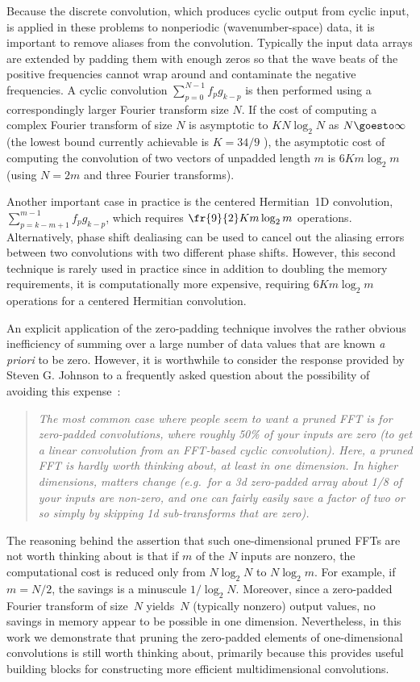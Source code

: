 \documentclass[final]{siamltex}
\begin{document}
Because the discrete convolution, which produces cyclic output from cyclic
input, is applied in these problems to nonperiodic (wavenumber-space) data,
it is important
to remove aliases from the convolution. Typically the input data arrays are
extended by padding them with enough zeros so that the wave beats of
the positive frequencies cannot wrap around and contaminate
the negative frequencies. A cyclic convolution $\sum_{p=0}^{N-1} f_p g_{k-p}$ 
is then performed using a
correspondingly larger Fourier transform size $N$. If the cost of 
computing a complex Fourier transform of size $N$ is asymptotic to 
$K N\log_2 N$ as \hbox{$N\goesto\infty$} (the lowest bound currently 
achievable is $K=34/9$ \cite{Johnson07,Lundy07}), the asymptotic cost of
computing the convolution of two vectors of unpadded length $m$ is
$6Km\log_2 m$ (using $N=2m$ and three Fourier transforms).

Another important case in practice is the centered Hermitian~1D convolution,
$\sum_{p=k-m+1}^{m-1} f_p g_{k-p}$, which requires $\fr{9}{2}Km\log_2 m$
operations.
Alternatively, phase shift dealiasing \cite{Patterson71,Canuto06} can be used
to cancel out the aliasing errors between two convolutions with two
different phase shifts. However, this second technique is rarely used in
practice since in addition to doubling the memory requirements, it is
computationally more expensive, requiring $6K m\log_2 m$ operations for a 
centered Hermitian convolution.

An explicit application of the zero-padding technique involves the rather
obvious inefficiency of summing over a large number of data values that
are known {\it a priori\/} to be zero.
However, it is worthwhile to consider the response
provided by Steven G. Johnson to a frequently asked question about the
possibility of avoiding this expense~\cite{fftwprune}:
\begin{quotation}\label{Johnson}
{\it
The most common case where people seem to want a pruned FFT is for
zero-padded convolutions, where roughly 50\% of your inputs are zero (to
get a linear convolution from an FFT-based cyclic convolution). Here, a
pruned FFT is hardly worth thinking about, at least in one dimension. In
higher dimensions, matters change (e.g.\ for a 3d zero-padded array about
1/8 of your inputs are non-zero, and one can fairly easily save a factor of
two or so simply by skipping 1d sub-transforms that are zero).
}
\end{quotation}

The reasoning behind the assertion that such one-dimensional pruned FFTs
are not worth thinking about is that if $m$ of the $N$ inputs are nonzero,
the computational cost is reduced only from $N\log_2 N$ to $N\log_2 m$.
For example, if $m=N/2$, the savings is a minuscule $1/\log_2 N$.
Moreover, since a zero-padded Fourier transform of size~$N$ yields~$N$
(typically nonzero) output values, no savings in memory appear to be
possible in one dimension. Nevertheless, in this work we demonstrate that
pruning the zero-padded elements of one-dimensional convolutions is still
worth thinking about, primarily because this provides useful building blocks
for constructing more efficient multidimensional convolutions.
\end{document}
